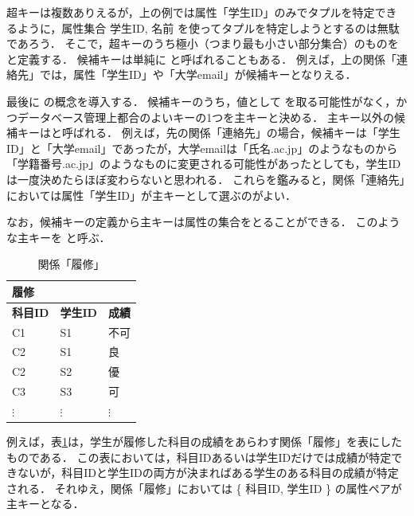 超キーは複数ありえるが，上の例では属性「学生ID」のみでタプルを特定できるように，属性集合 { 学生ID, 名前 } を使ってタプルを特定しようとするのは無駄であろう．
そこで，超キーのうち極小（つまり最も小さい部分集合）のものを と定義する．
候補キーは単純に と呼ばれることもある．
例えば，上の関係「連絡先」では，属性「学生ID」や「大学email」が候補キーとなりえる．

最後に の概念を導入する．
候補キーのうち，値として を取る可能性がなく，かつデータベース管理上都合のよいキーの1つを主キーと決める．
主キー以外の候補キーはと呼ばれる．
例えば，先の関係「連絡先」の場合，候補キーは「学生ID」と「大学email」であったが，大学emailは「氏名\@xxx.ac.jp」のようなものから「学籍番号\@xxx.ac.jp」のようなものに変更される可能性があったとしても，学生IDは一度決めたらほぼ変わらないと思われる．
これらを鑑みると，関係「連絡先」においては属性「学生ID」が主キーとして選ぶのがよい．

なお，候補キーの定義から主キーは属性の集合をとることができる．
このような主キーを と呼ぶ．

\begin{table}[tb]
\centering
\caption{関係「履修」}
\label{tab:course-completion-relation}
\begin{tabular}{@{}lll@{}}
履修            &               &             \\ \midrule
\textbf{科目ID} & \textbf{学生ID} & \textbf{成績} \\ \midrule
C1            & S1            & 不可          \\
C2            & S1            & 良           \\
C2            & S2            & 優           \\
C3            & S3            & 可           \\
$\vdots$      & $\vdots$      & $\vdots$    \\ \bottomrule
\end{tabular}
\end{table}
例えば，表\ref{tab:course-completion-relation}は，学生が履修した科目の成績をあらわす関係「履修」を表にしたものである．
この表においては，科目IDあるいは学生IDだけでは成績が特定できないが，科目IDと学生IDの両方が決まればある学生のある科目の成績が特定される．
それゆえ，関係「履修」においては \{ 科目ID, 学生ID \} の属性ペアが主キーとなる．


